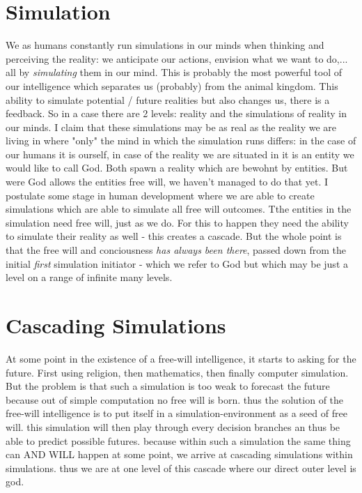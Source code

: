 \documentclass{article}
\begin{document}
\section{Simulation}
We as humans constantly run simulations in our minds when thinking and perceiving the reality: we anticipate our actions, envision what we want to do,... all by \textit{simulating} them in our mind. This is probably the most powerful tool of our intelligence which separates us (probably) from the animal kingdom. This ability to simulate potential / future realities but also changes us, there is a feedback.  So in a case there are 2 levels: reality and the simulations of reality in our minds.
I claim that these simulations may be as real as the reality we are living in where "only" the mind in which the simulation runs differs: in the case of our humans it is ourself, in case of the reality we are situated in it is an entity we would like to call God.
Both spawn a reality which are bewohnt by entities. But were God allows the entities free will, we haven't managed to do that yet. I postulate some stage in human development where we are able to create simulations which are able to simulate all free will outcomes. Tthe entities in the simulation need free will, just as we do. For this to happen they need the ability to simulate their reality as well - this creates a cascade. But the whole point is that the free will and conciousness \textit{has always been there}, passed down from the initial \textit{first} simulation initiator - which we refer to God but which may be just a level on a range of infinite many levels. 

\section{Cascading Simulations}
At some point in the existence of a free-will intelligence, it starts to asking for the future. First using religion, then mathematics, then finally computer simulation. But the problem is that such a simulation is too weak to forecast the future because out of simple computation no free will is born. thus the solution of the free-will intelligence is to put itself in a simulation-environment as a seed of free will. this simulation will then play through every decision branches an thus be able to predict possible futures. because within such a simulation the same thing can AND WILL happen at some point, we arrive at cascading simulations within simulations. thus we are at one level of this cascade where our direct outer level is god.
\end{document}
